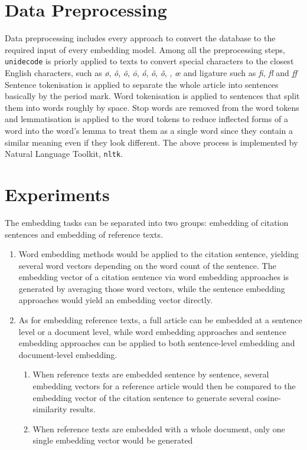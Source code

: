 \section{Data Preprocessing}
Data preprocessing includes every approach to convert the database to the required input of every embedding model.
Among all the preprocessing steps, \texttt{unidecode} is priorly applied to texts to convert special characters to the closest English characters, such as \textit{\o}, \textit{\^o}, \textit{\~o}, \textit{\=o}, \textit{\'o}, \textit{\u o}, \textit{\v o}, \textit{\oo}, \textit{\oe} and ligature such as \textit{fi}, \textit{fl} and \textit{ff}
Sentence tokenisation is applied to separate the whole article into sentences basically by the period mark.
Word tokenisation is applied to sentences that split them into words roughly by space.
Stop words are removed from the word tokens and lemmatisation is applied to the word tokens to reduce inflected forms of a word into the word's lemma to treat them as a single word since they contain a similar meaning even if they look different.
The above process is implemented by Natural Language Toolkit, \texttt{nltk}.

\section{Experiments}
The embedding tasks can be separated into two groups: embedding of citation sentences and embedding of reference texts.

\begin{enumerate}
    \item Word embedding methods would be applied to the citation sentence, yielding several word vectors depending on the word count of the sentence.
    The embedding vector of a citation sentence via word embedding approaches is generated by averaging those word vectors, while the sentence embedding approaches would yield an embedding vector directly.
    \item As for embedding reference texts, a full article can be embedded at a sentence level or a document level, while word embedding approaches and sentence embedding approaches can be applied to both sentence-level embedding and document-level embedding.
    \begin{enumerate}
        \item When reference texts are embedded sentence by sentence, several embedding vectors for a reference article would then be compared to the embedding vector of the citation sentence to generate several cosine-similarity results.
        \item When reference texts are embedded with a whole document, only one single embedding vector would be generated 
    \end{enumerate}
    
\end{enumerate}